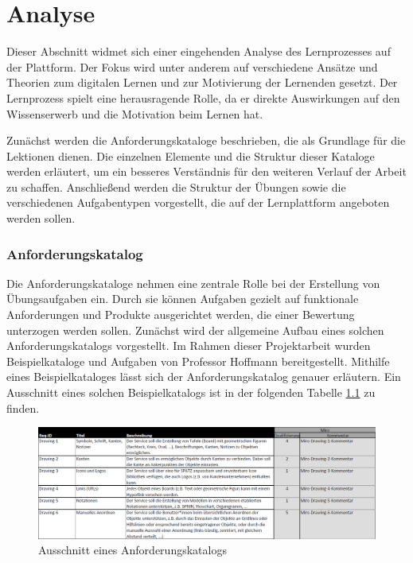 \chapter{Analyse}

Dieser Abschnitt widmet sich einer eingehenden Analyse des Lernprozesses auf der Plattform. Der Fokus wird unter anderem auf verschiedene Ansätze und Theorien zum digitalen Lernen und zur Motivierung der Lernenden gesetzt.
Der Lernprozess spielt eine herausragende Rolle, da er direkte Auswirkungen auf den Wissenserwerb und die Motivation beim Lernen hat.

Zunächst werden die Anforderungskataloge beschrieben, die als Grundlage für die Lektionen dienen. Die einzelnen Elemente und die Struktur dieser Kataloge werden erläutert, um ein besseres Verständnis für den weiteren Verlauf der Arbeit zu schaffen. 
Anschließend werden die Struktur der Übungen sowie die verschiedenen Aufgabentypen vorgestellt, die auf der Lernplattform angeboten werden sollen.

\subsection{Anforderungskatalog}
Die Anforderungskataloge nehmen eine zentrale Rolle bei der Erstellung von Übungsaufgaben ein. Durch sie können Aufgaben gezielt auf funktionale Anforderungen und Produkte ausgerichtet werden, die einer Bewertung unterzogen werden sollen.
Zunächst wird der allgemeine Aufbau eines solchen Anforderungskatalogs vorgestellt. Im Rahmen dieser Projektarbeit wurden Beispielkataloge und Aufgaben von Professor Hoffmann bereitgestellt. Mithilfe eines Beispielkataloges lässt sich der Anforderungskatalog genauer erläutern.
Ein Ausschnitt eines solchen Beispielkatalogs ist in der folgenden Tabelle \ref{fig:Anforderungskatalog-Bsp} zu finden.

\begin{figure}[H]
    \centering
    \includegraphics[width=1.0\textwidth]{assets/screenshots/kataloge/KatalogBspAusschnitt.png}
    \caption{Ausschnitt eines Anforderungskatalogs}
    \label{fig:Anforderungskatalog-Bsp}
\end{figure}

